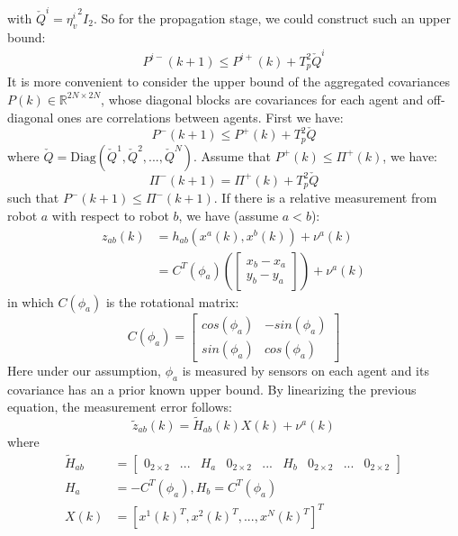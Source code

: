 \documentclass[conference]{IEEEtran}
\begin{document}
with $\check{Q}^i = {\eta_v^{i}}^2 I_{2}$.
So for the propagation stage, we could construct such an upper bound:
\begin{equation}
\begin{split}
	P^{i-}(k+1) \leq P^{i+}(k) + T_p^2\check{Q}^i
\end{split}
\end{equation}
It is more convenient to consider the upper bound of the aggregated covariances $P(k)\in\mathbb{R}^{2N\times2N}$, whose diagonal blocks are covariances for each agent and off-diagonal ones are correlations between agents.
First we have:
\begin{equation}
P^{-}(k+1) \leq P^{+}(k) + T_p^2 \check{Q}
\end{equation}
where $\check{Q} = \text{Diag}(\check{Q}^1,\check{Q}^2,...,\check{Q}^N)$.
Assume that $P^{+}(k)\leq\Pi^{+}(k)$, we have:
\begin{equation}
\Pi^-(k+1) = \Pi ^+(k) + T_p^2 \check{Q}
\end{equation}
such that $P^{-}(k+1) \leq \Pi^-(k+1)$.
If there is a relative measurement from robot $a$ with respect to robot $b$, we have (assume $a<b$):
\begin{equation*}
\begin{split}
z_{ab} (k) &= h_{ab}(x^a(k),x^b(k)) + \nu^a(k)
\\&= C^T(\phi_a) \left(\begin{bmatrix}
x_b - x_a \\ y_b - y_a
\end{bmatrix}\right)
+ \nu^a(k)
\end{split}
\end{equation*}
in which $C(\phi_a)$ is the rotational matrix:
\begin{equation*}
C(\phi_a) = \begin{bmatrix}
cos(\phi_a) & -sin(\phi_a) \\
sin(\phi_a) & cos(\phi_a)
\end{bmatrix}
\end{equation*}
Here under our assumption, $\phi_a$ is measured by sensors on each agent and its covariance has an a prior known upper bound.
By linearizing the previous equation, the measurement error follows:
\begin{equation}
	\tilde{z}_{ab}(k) = \tilde{H}_{ab}(k)X(k) + \nu^a(k)
\end{equation}
where
\begin{equation*}
\begin{split}
	\tilde{H}_{ab} &= \begin{bmatrix}
0_{2\times2} &... &{H}_a &0_{2\times2}&...&H_b & 0_{2\times2} & ...&0_{2\times2}
\end{bmatrix}
\\
H_a &= -C^T(\phi_a),H_b = C^T(\phi_a)
\\
X(k) &= [x^1(k)^T,x^2(k)^T,...,x^N(k)^T]^T
\end{split}
\end{equation*}
\end{document}
